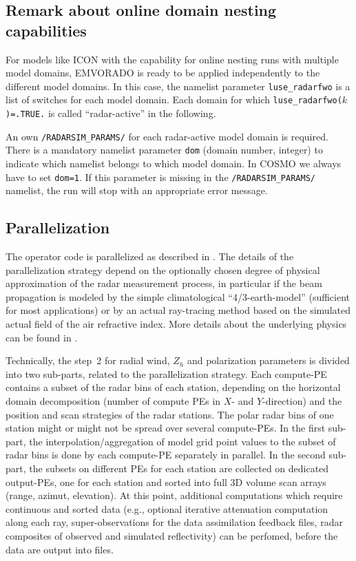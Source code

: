 \documentclass[10pt,a4paper,twoside,headinclude,footinclude,parskip=half]{scrartcl}
\newcommand{\myaktuellesection}{sec:intro}%
\newcommand{\labelsec}[1]{\label{#1}\renewcommand{\myaktuellesection}{#1}}%
\newcommand{\labelsec}[1]{\label{#1}}%
\newcommand{\citeP}[1]{\citet{#1}}
\newcommand{\srcform}[1]{\mbox{\texttt{#1}}\xspace}%
\begin{document}
\subsection{Remark about online domain nesting capabilities}

\labelsec{sec:intro:idom}

For models like ICON with the capability for online nesting runs with multiple model domains, EMVORADO
is ready to be applied independently to the different model domains.
In this case, the namelist parameter \srcform{luse_radarfwo} is a list of switches for each
model domain. Each domain for which \srcform{luse_radarfwo($k$)=.TRUE.} is called ``radar-active'' in the following.

An own \srcform{/RADARSIM_PARAMS/} for each radar-active model domain is required.
There is a mandatory namelist parameter \srcform{dom} (domain number, integer) to indicate
which namelist belongs to which model domain. In COSMO we always have to set \srcform{dom=1}.
If this parameter is missing in the \srcform{/RADARSIM_PARAMS/} namelist, the run will stop with an
appropriate error message.


\subsection{Parallelization}

\labelsec{sec:intro:parallel}

The operator code is parallelized as described in \citeP{zeng2016a}. The details of the
parallelization strategy depend on the optionally chosen degree of physical approximation of the radar
measurement process, in particular if the beam propagation is modeled by the simple
climatological ``4/3-earth-model'' (sufficient for most applications) or by an actual
ray-tracing method based on the simulated actual field of the air refractive index.
More details about the underlying physics can be found in \citeP{zeng2014}. 


Technically, the step~2 for radial wind, $Z_h$ and polarization parameters is divided into two sub-parts,
related to the parallelization strategy. Each compute-PE contains a subset of the radar bins
of each station, depending on the horizontal domain decomposition (number of compute PEs in $X$- and $Y$-direction)
and the position and scan strategies of the radar stations. The polar radar bins of
one station might or might not be spread over several compute-PEs. In the first sub-part, 
the interpolation/aggregation of model grid point values to the subset of radar bins is done by
each compute-PE separately in parallel. In the second sub-part, the subsets on different PEs for
each station are collected on dedicated output-PEs, one for each station and sorted into full
3D volume scan arrays (range, azimut, elevation). At this point, additional computations
which require continuous and sorted data (e.g., optional iterative attenuation computation along each ray,
super-observations for the data assimilation feedback files, radar composites of observed and simulated reflectivity) can
be perfomed, before the data are output into files.
\end{document}
